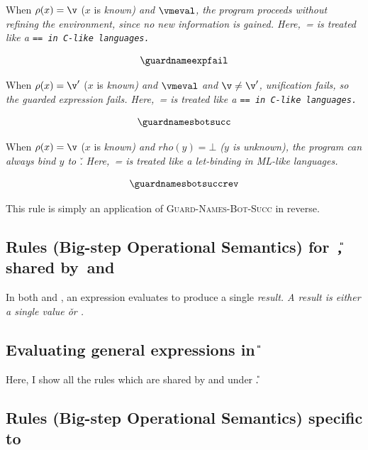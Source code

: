 \documentclass[manuscript,screen 12pt, nonacm]{acmart}
\begin{document}
When $\rho(x) = \v$ ($x$ is \it{known}) and $\vmeval$, the program proceeds
without refining the environment, since no new information is gained.
Here,~\it{=} is treated like a \tt{==} in C-like languages. 

\[
\guardnameexpfail
\]

When $\rho(x) = \v'$ ($x$ is \it{known}) and $\vmeval$ and $\v \neq \v'$,
unification fails, so the guarded expression fails. Here,~\it{=} is treated like
a \tt{==} in C-like languages. 

\[
\guardnamesbotsucc
\]

When $\rho(x) = \v$ ($x$ is \it{known}) and $rho(y) = \bot$ ($y$ is
\it{unknown}), the program can always bind $y$ to \v. Here,~\it{=} is treated
like a let-binding in ML-like languages. 

\[
\guardnamesbotsuccrev
\]

This rule is simply an application of \textsc{Guard-Names-Bot-Succ} in reverse. 
    
    \vfilbreak
    
    \subsection{Rules (Big-step Operational Semantics) for~\U, shared by~\VMinus and~\D}
    \label{usemantics1}
    In both \VMinus and \D, an expression evaluates to produce a single \it{result}. 
A result is either a single value \v or \fail. 


\subsection{Evaluating general expressions in \U}

Here, I show all the rules which are shared by \VMinus and \D under \U. 

    \usemantics 
    \subsection{Rules (Big-step Operational Semantics) specific to~\VMinus}
    \label{vmsemantics}
    \vmsemantics
\end{document}
